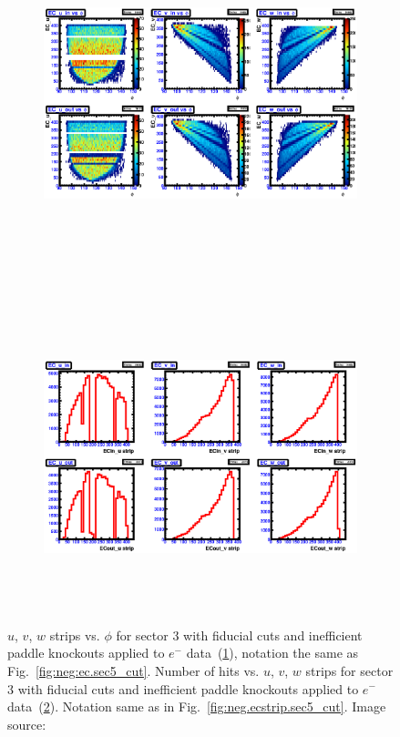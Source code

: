 \begin{figure}[!ht]
  \centering
  \begin{subfigure}[b]{\figwidth}
  \includegraphics[width=\figwidth, height=3.5in,valign=c]{figures/calib/ec/pim_ecuvw_phi_afterGeoFid_sec3.eps}\caption{}\label{fig:EC_III_III}
  \end{subfigure}%
  \\
  \begin{subfigure}[b]{\figwidth}
  \includegraphics[width=\figwidth, height=3.5in,valign=c]{figures/calib/ec/pim_ecuvw_afterGeoFid_sec3.eps}\caption{}\label{fig:EC_IV_III}
  \end{subfigure}%
      \caption { $u$, $v$, $w$ strips vs. $\phi$ for sector 3 with fiducial cuts and inefficient paddle knockouts applied to $e^-$ data~(\ref{fig:EC_III_III}), notation the same as Fig.~\ref{fig:neg:ec.sec5_cut}. Number of hits vs.  $u$, $v$, $w$ strips for sector 3 with fiducial cuts and inefficient paddle knockouts applied to $e^-$ data~(\ref{fig:EC_IV_III}). Notation same as in Fig.~\ref{fig:neg.ecstrip.sec5_cut}. Image source:~\cite{clas.thesis.kunkel}}
        \label{fig:EC_cut_III}
\end{figure}


